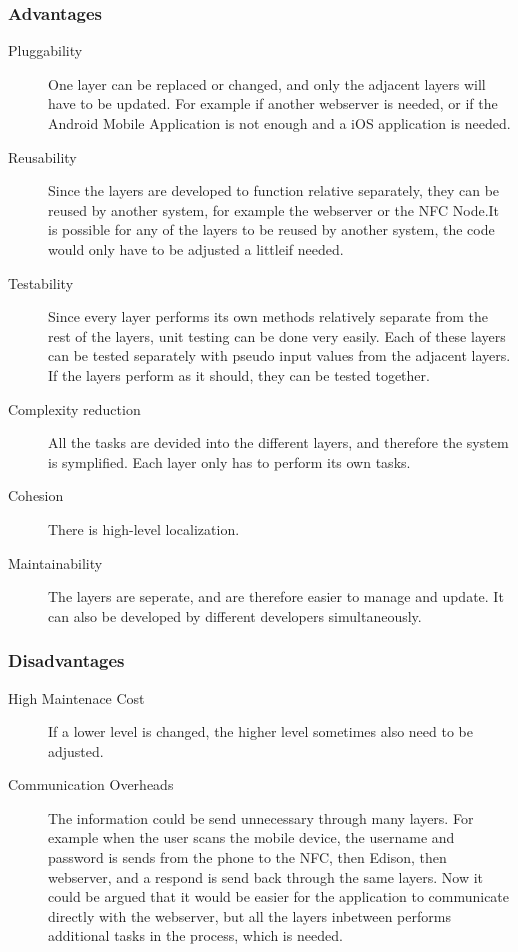 \documentclass[a4paper,12pt,titlepage]{article}
\begin{document}
\subsubsection{Advantages}
\begin{description}
\item[Pluggability] One layer can be replaced or changed, and only the adjacent layers will have to be updated. For example if another webserver is needed, or if the Android Mobile Application is not enough and a iOS application is needed.
\item[Reusability] Since the layers are developed to function relative separately, they can be reused by another system, for example the webserver or the NFC Node.It is possible for any of the layers to be reused by another system, the code would only have to be adjusted a littleif needed.  
\item[Testability] Since every layer performs its own methods relatively separate from the rest of the layers, unit testing can be done very easily. Each of these layers can be tested separately with pseudo input values from the adjacent layers. If the layers perform as it should, they can be tested together.
\item[Complexity reduction] All the tasks are devided into the different layers, and therefore the system is symplified. Each layer only has to perform its own tasks.
\item[Cohesion] There is high-level localization. 
\item[Maintainability] The layers are seperate, and are therefore easier to manage and update. It can also be developed by different developers simultaneously. 
\end{description}
\subsubsection{Disadvantages}
\begin{description}
\item[High Maintenace Cost] If a lower level is changed, the higher level sometimes also need to be adjusted.
\item[Communication Overheads] The information could be send  unnecessary through many layers. For example when the user scans the mobile device, the username and password is sends from the phone to the NFC, then Edison, then webserver, and a respond is send back through the same layers. Now it could be argued that it would be easier for the application to communicate directly with the webserver, but all the layers inbetween performs additional tasks in the process, which is needed.

\end{description}
\end{document}
